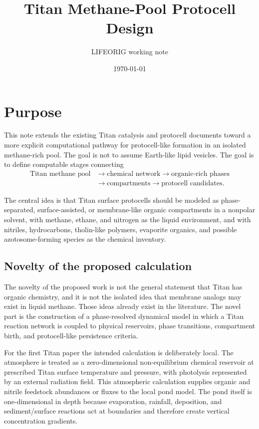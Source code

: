 \documentclass[11pt]{article}
\title{Titan Methane-Pool Protocell Design}
\author{LIFEORIG working note}
\date{\today}
\begin{document}
\maketitle

\section{Purpose}

This note extends the existing Titan catalysis and protocell documents toward a more explicit computational pathway for protocell-like formation in an isolated methane-rich pool. The goal is not to assume Earth-like lipid vesicles. The goal is to define computable stages connecting
\begin{align}
\text{Titan methane pool}
&\rightarrow
\text{chemical network}
\rightarrow
\text{organic-rich phases}
\nonumber\\
&\rightarrow
\text{compartments}
\rightarrow
\text{protocell candidates}.
\end{align}

The central idea is that Titan surface protocells should be modeled as phase-separated, surface-assisted, or membrane-like organic compartments in a nonpolar solvent, with methane, ethane, and nitrogen as the liquid environment, and with nitriles, hydrocarbons, tholin-like polymers, evaporite organics, and possible azotosome-forming species as the chemical inventory.

\subsection{Novelty of the proposed calculation}

The novelty of the proposed work is not the general statement that Titan has organic chemistry, and it is not the isolated idea that membrane analogs may exist in liquid methane. Those ideas already exist in the literature. The novel part is the construction of a phase-resolved dynamical model in which a Titan reaction network is coupled to physical reservoirs, phase transitions, compartment birth, and protocell-like persistence criteria.

For the first Titan paper the intended calculation is deliberately local. The atmosphere is treated as a zero-dimensional non-equilibrium chemical reservoir at prescribed Titan surface temperature and pressure, with photolysis represented by an external radiation field. This atmospheric calculation supplies organic and nitrile feedstock abundances or fluxes to the local pond model. The pond itself is one-dimensional in depth because evaporation, rainfall, deposition, and sediment/surface reactions act at boundaries and therefore create vertical concentration gradients.
\end{document}
